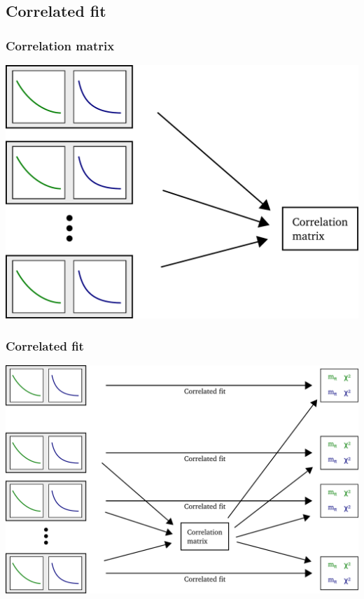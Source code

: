 \documentclass[english, fleqn]{beamer}
\begin{document}
\subsection{Correlated fit}

\begin{frame}
    \frametitle{Correlation matrix}
    \begin{center}
        \includegraphics[scale=\scale]{sketches/05-matrix.pdf}
    \end{center}
\end{frame}

\begin{frame}
    \frametitle{Correlated fit}
    \begin{center}
        \includegraphics[scale=\scale]{sketches/06-fit.pdf}
    \end{center}
\end{frame}
\end{document}

